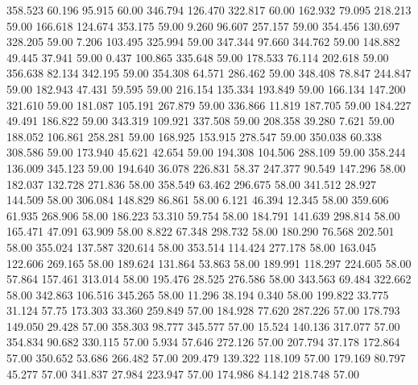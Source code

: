  358.523   60.196   95.915        60.00
 346.794  126.470  322.817        60.00
 162.932   79.095  218.213        59.00
 166.618  124.674  353.175        59.00
   9.260   96.607  257.157        59.00
 354.456  130.697  328.205        59.00
   7.206  103.495  325.994        59.00
 347.344   97.660  344.762        59.00
 148.882   49.445   37.941        59.00
   0.437  100.865  335.648        59.00
 178.533   76.114  202.618        59.00
 356.638   82.134  342.195        59.00
 354.308   64.571  286.462        59.00
 348.408   78.847  244.847        59.00
 182.943   47.431   59.595        59.00
 216.154  135.334  193.849        59.00
 166.134  147.200  321.610        59.00
 181.087  105.191  267.879        59.00
 336.866   11.819  187.705        59.00
 184.227   49.491  186.822        59.00
 343.319  109.921  337.508        59.00
 208.358   39.280    7.621        59.00
 188.052  106.861  258.281        59.00
 168.925  153.915  278.547        59.00
 350.038   60.338  308.586        59.00
 173.940   45.621   42.654        59.00
 194.308  104.506  288.109        59.00
 358.244  136.009  345.123        59.00
 194.640   36.078  226.831        58.37
 247.377   90.549  147.296        58.00
 182.037  132.728  271.836        58.00
 358.549   63.462  296.675        58.00
 341.512   28.927  144.509        58.00
 306.084  148.829   86.861        58.00
   6.121   46.394   12.345        58.00
 359.606   61.935  268.906        58.00
 186.223   53.310   59.754        58.00
 184.791  141.639  298.814        58.00
 165.471   47.091   63.909        58.00
   8.822   67.348  298.732        58.00
 180.290   76.568  202.501        58.00
 355.024  137.587  320.614        58.00
 353.514  114.424  277.178        58.00
 163.045  122.606  269.165        58.00
 189.624  131.864   53.863        58.00
 189.991  118.297  224.605        58.00
  57.864  157.461  313.014        58.00
 195.476   28.525  276.586        58.00
 343.563   69.484  322.662        58.00
 342.863  106.516  345.265        58.00
  11.296   38.194    0.340        58.00
 199.822   33.775   31.124        57.75
 173.303   33.360  259.849        57.00
 184.928   77.620  287.226        57.00
 178.793  149.050   29.428        57.00
 358.303   98.777  345.577        57.00
  15.524  140.136  317.077        57.00
 354.834   90.682  330.115        57.00
   5.934   57.646  272.126        57.00
 207.794   37.178  172.864        57.00
 350.652   53.686  266.482        57.00
 209.479  139.322  118.109        57.00
 179.169   80.797   45.277        57.00
 341.837   27.984  223.947        57.00
 174.986   84.142  218.748        57.00

